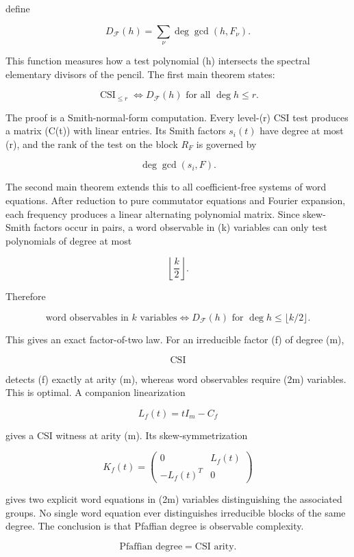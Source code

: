 \documentclass[11pt]{article}
\begin{document}
define

\[
D_{\mathcal F}(h)
=\sum_\nu
\deg\gcd(h,F_\nu).
\]

This function measures how a test polynomial (h) intersects the spectral elementary divisors of the pencil. The first main theorem states:

\[
\boxed{
\operatorname{CSI}_{\le r}
\Longleftrightarrow
D_{\mathcal F}(h)\text{ for all }\deg h\le r.
}
\]

The proof is a Smith-normal-form computation. Every level-(r) CSI test produces a matrix (C(t)) with linear entries. Its Smith factors $s_i(t)$ have degree at most (r), and the rank of the test on the block $R_F$ is governed by

\[
\deg\gcd(s_i,F).
\]

The second main theorem extends this to all coefficient-free systems of word equations. After reduction to pure commutator equations and Fourier expansion, each frequency produces a linear alternating polynomial matrix. Since skew-Smith factors occur in pairs, a word observable in (k) variables can only test polynomials of degree at most

\[
\left\lfloor\frac k2\right\rfloor.
\]

Therefore

\[
\boxed{
\text{word observables in }k\text{ variables}
\Longleftrightarrow
D_{\mathcal F}(h)\text{ for }\deg h\le\lfloor k/2\rfloor.
}
\]

This gives an exact factor-of-two law. For an irreducible factor (f) of degree (m),

\[
\operatorname{CSI}
\]

detects (f) exactly at arity (m), whereas word observables require (2m) variables. This is optimal. A companion linearization

\[
L_f(t)=tI_m-C_f
\]

gives a CSI witness at arity (m). Its skew-symmetrization

\[
K_f(t)=
\begin{pmatrix}
0 & L_f(t)\\
-L_f(t)^T & 0
\end{pmatrix}
\]

gives two explicit word equations in (2m) variables distinguishing the associated groups. No single word equation ever distinguishes irreducible blocks of the same degree. The conclusion is that Pfaffian degree is observable complexity.

\[
\boxed{
\text{Pfaffian degree}=
\text{CSI arity}.
}
\]
\end{document}

